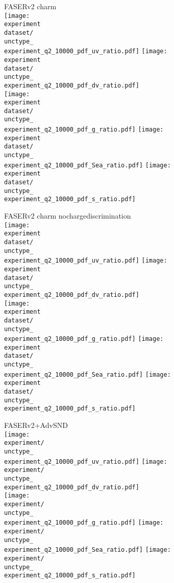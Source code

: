 \documentclass{article}
\newcommand{\figw}{70mm}
\newcommand{\experiment}{FASERv2}
\newcommand{\unctype}{fred05}
\begin{document}
\newpage

FASERv2 charm\\
\renewcommand{\dataset}{_charm}
\texttt{[image: \\experiment\\dataset/\\unctype\_\\experiment\_q2\_10000\_pdf\_uv\_ratio.pdf]}
\texttt{[image: \\experiment\\dataset/\\unctype\_\\experiment\_q2\_10000\_pdf\_dv\_ratio.pdf]}\\
\texttt{[image: \\experiment\\dataset/\\unctype\_\\experiment\_q2\_10000\_pdf\_g\_ratio.pdf]}
\texttt{[image: \\experiment\\dataset/\\unctype\_\\experiment\_q2\_10000\_pdf\_Sea\_ratio.pdf]}
\texttt{[image: \\experiment\\dataset/\\unctype\_\\experiment\_q2\_10000\_pdf\_s\_ratio.pdf]}

\newpage

FASERv2 charm nochargediscrimination\\
\renewcommand{\dataset}{_charm_nochargediscrimination}
\texttt{[image: \\experiment\\dataset/\\unctype\_\\experiment\_q2\_10000\_pdf\_uv\_ratio.pdf]}
\texttt{[image: \\experiment\\dataset/\\unctype\_\\experiment\_q2\_10000\_pdf\_dv\_ratio.pdf]}\\
\texttt{[image: \\experiment\\dataset/\\unctype\_\\experiment\_q2\_10000\_pdf\_g\_ratio.pdf]}
\texttt{[image: \\experiment\\dataset/\\unctype\_\\experiment\_q2\_10000\_pdf\_Sea\_ratio.pdf]}
\texttt{[image: \\experiment\\dataset/\\unctype\_\\experiment\_q2\_10000\_pdf\_s\_ratio.pdf]}

\newpage

FASERv2+AdvSND\\
\renewcommand{\experiment}{FPF}
\texttt{[image: \\experiment/\\unctype\_\\experiment\_q2\_10000\_pdf\_uv\_ratio.pdf]}
\texttt{[image: \\experiment/\\unctype\_\\experiment\_q2\_10000\_pdf\_dv\_ratio.pdf]}\\
\texttt{[image: \\experiment/\\unctype\_\\experiment\_q2\_10000\_pdf\_g\_ratio.pdf]}
\texttt{[image: \\experiment/\\unctype\_\\experiment\_q2\_10000\_pdf\_Sea\_ratio.pdf]}
\texttt{[image: \\experiment/\\unctype\_\\experiment\_q2\_10000\_pdf\_s\_ratio.pdf]}
\end{document}
